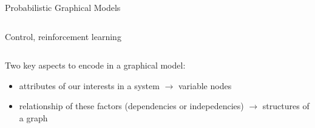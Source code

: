 \begin{frame}{Probabilistic Graphical Models}
\begin{itemize}
\begin{columns}
        
        \centering
        Control, reinforcement learning
      \end{columns}
    
  \end{itemize}
  Two key aspects to encode in a graphical model:

    \begin{itemize}[label={$\bullet$}]
    \item attributes of our interests in a system $\rightarrow$ variable nodes
    \item relationship of these factors (dependencies or indepedencies) $\rightarrow$ structures of a graph
    \end{itemize}
\end{frame}
